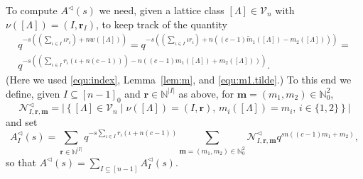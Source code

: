 \documentclass[11pt]{amsart}
\numberwithin{equation}{section}
\numberwithin{figure}{section}
\theoremstyle{plain}
\theoremstyle{definition}
\theoremstyle{remark}
\begin{document}
To compute $A^{\triangleleft}(s)$ we need, given a lattice class
$[\Lambda]\in{\ensuremath{\mathcal{V}}}_n$ with $\nu([\Lambda])=(I,{\ensuremath{\mathbf{r}}}_I)$, to keep track
of the quantity
\begin{multline*}
  q^{-s\left( (\sum_{\iota\in I}\iota r_{\iota}) +
    nw([\Lambda])\right)} = q^{-s\left( (\sum_{\iota\in I}\iota
    r_\iota) + n((c-1){\ensuremath{\widetilde{m}}}_1([\Lambda]) - m_2([\Lambda]))\right)}
  =\\ q^{-s\left( (\sum_{\iota\in I} r_{\iota}(\iota +
    n(c-1)))-n((c-1)m_1([\Lambda]) + m_2([\Lambda]))\right)}.
\end{multline*}
(Here we used \eqref{equ:index}, Lemma~\ref{lem:m}, and
\eqref{equ:m1.tilde}.)  To this end we define, given $I\subseteq
[n-1]_0$ and ${\ensuremath{\mathbf{r}}}\in{\ensuremath{\mathbb{N}}}^{|I|}$ as above, for
${\ensuremath{\mathbf{m}}}=(m_1,m_2)\in{\ensuremath{\mathbb{N}}}_0^2$,
\begin{equation*}
 {\ensuremath{\mathcal{N}}}^{\triangleleft}_{I,{\ensuremath{\mathbf{r}}},{\ensuremath{\mathbf{m}}}} = \left| \left\{[\Lambda] \in {\ensuremath{\mathcal{V}}}_n \mid
 \nu([\Lambda]) = (I,{\ensuremath{\mathbf{r}}}),\, m_i([\Lambda]) = m_i, \,
 i\in\{1,2\}\right\}\right|
\end{equation*}
and set
\begin{equation}\label{def:AidI}
  A_{I}^{\triangleleft}(s) = \sum_{{\ensuremath{\mathbf{r}}}\in{\ensuremath{\mathbb{N}}}^{|I|}} q^{-s\sum_{\iota\in
      I}r_\iota(\iota+n(c-1))}
  \sum_{{\ensuremath{\mathbf{m}}}=(m_1,m_2)\in{\ensuremath{\mathbb{N}}}_0^2}{\ensuremath{\mathcal{N}}}^{\triangleleft}_{I,{\ensuremath{\mathbf{r}}},{\ensuremath{\mathbf{m}}}}q^{sn\left((c-1)m_1+m_2\right)},
\end{equation} 
so that $A^{\triangleleft}(s) = \sum_{I\subseteq [n-1]}A_I^{\triangleleft}(s)$.
\end{document}
